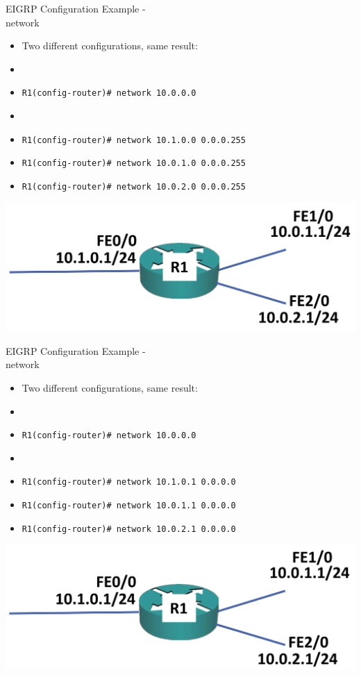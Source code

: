 \documentclass[pdflatex,compress,mathserif]{beamer}
\begin{document}
\begin{frame}{EIGRP Configuration Example -\\ network}
	\begin{itemize}
		\item Two different configurations, same result:
		\item[] 
		\item \texttt{R1(config-router)\# network 10.0.0.0}
		\item[]
		\item \texttt{R1(config-router)\# network 10.1.0.0 0.0.0.255}
		\item \texttt{R1(config-router)\# network 10.0.1.0 0.0.0.255}
		\item \texttt{R1(config-router)\# network 10.0.2.0 0.0.0.255}
	\end{itemize}
	\begin{center}
		\includegraphics[width=0.5\linewidth]{img/img18}
	\end{center}
\end{frame}

\begin{frame}{EIGRP Configuration Example -\\ network}
	\begin{itemize}
		\item Two different configurations, same result:
		\item[] 
		\item \texttt{R1(config-router)\# network 10.0.0.0}
		\item[]
		\item \texttt{R1(config-router)\# network 10.1.0.1 0.0.0.0}
		\item \texttt{R1(config-router)\# network 10.0.1.1 0.0.0.0}
		\item \texttt{R1(config-router)\# network 10.0.2.1 0.0.0.0}
	\end{itemize}
	\begin{center}
		\includegraphics[width=0.5\linewidth]{img/img19}
	\end{center}
\end{frame}
\end{document}
